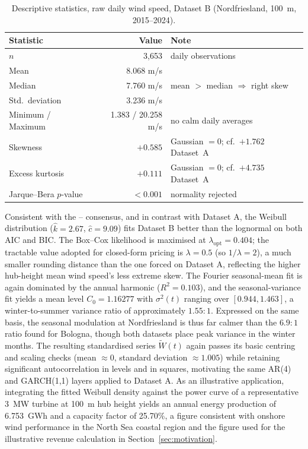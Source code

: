 \documentclass[11pt, a4paper, twoside]{article}
\begin{document}
\begin{table}[htbp]
\centering
\caption{Descriptive statistics, raw daily wind speed, Dataset B (Nordfriesland, 100~m, 2015--2024).}
\label{tab:desc-b}
\begin{tabular}{lrl}
\toprule
\textbf{Statistic} & \textbf{Value} & \textbf{Note} \\
\midrule
$n$ & 3{,}653 & daily observations \\
Mean & 8.068 m/s & \\
Median & 7.760 m/s & mean $>$ median $\Rightarrow$ right skew \\
Std.\ deviation & 3.236 m/s & \\
Minimum / Maximum & 1.383 / 20.258 m/s & no calm daily averages \\
Skewness & $+0.585$ & Gaussian $= 0$; cf.\ $+1.762$ Dataset~A \\
Excess kurtosis & $+0.111$ & Gaussian $= 0$; cf.\ $+4.735$ Dataset~A \\
Jarque--Bera $p$-value & $< 0.001$ & normality rejected \\
\bottomrule
\end{tabular}
\end{table}

Consistent with the \citet{TullerBrett1984}--\citet{Garcia1998} consensus, and in contrast with Dataset A, the Weibull distribution ($\hat k = 2.67$, $\hat c = 9.09$) fits Dataset B better than the lognormal on both AIC and BIC. The Box--Cox likelihood is maximised at $\lambda_{\text{opt}} = 0.404$; the tractable value adopted for closed-form pricing is $\lambda = 0.5$ (so $1/\lambda = 2$), a much smaller rounding distance than the one forced on Dataset A, reflecting the higher hub-height mean wind speed's less extreme skew. The Fourier seasonal-mean fit is again dominated by the annual harmonic ($R^2 = 0.103$), and the seasonal-variance fit yields a mean level $C_0 = 1.16277$ with $\sigma^2(t)$ ranging over $[0.944, 1.463]$, a winter-to-summer variance ratio of approximately $1.55{:}1$. Expressed on the same basis, the seasonal modulation at Nordfriesland is thus far calmer than the $6.9{:}1$ ratio found for Bologna, though both datasets place peak variance in the winter months. The resulting standardised series $\widetilde W(t)$ again passes its basic centring and scaling checks (mean $\approx 0$, standard deviation $\approx 1.005$) while retaining significant autocorrelation in levels and in squares, motivating the same AR(4) and GARCH(1,1) layers applied to Dataset A. As an illustrative application, integrating the fitted Weibull density against the power curve of a representative 3~MW turbine at 100~m hub height yields an annual energy production of 6.753~GWh and a capacity factor of 25.70\%, a figure consistent with onshore wind performance in the North Sea coastal region and the figure used for the illustrative revenue calculation in Section~\ref{sec:motivation}.
\end{document}
